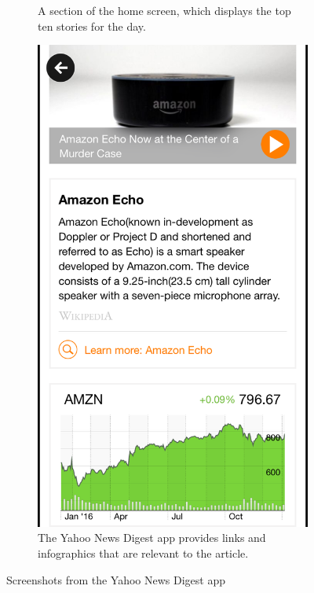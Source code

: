 \documentclass[12pt]{article}
\begin{document}
\begin{figure}[ht!]
\begin{subfigure}[t]{0.3\textwidth}
        \caption{A section of the home screen, which displays the top ten stories for the day.}
        \label{YNDHome}
    \end{subfigure}
    \qquad
    \begin{subfigure}[t]{0.3\textwidth}
    \includegraphics[width=\textwidth]{YNDInfo.PNG}
   \caption{The Yahoo News Digest app provides links and infographics that are relevant to the article.}
   \label{YNDInfo}
   \end{subfigure}
   \caption[Screenshots from the Yahoo News Digest app]{Screenshots from the Yahoo News Digest app\cite{yahooNewsDigest}}
\end{figure}
\end{document}

